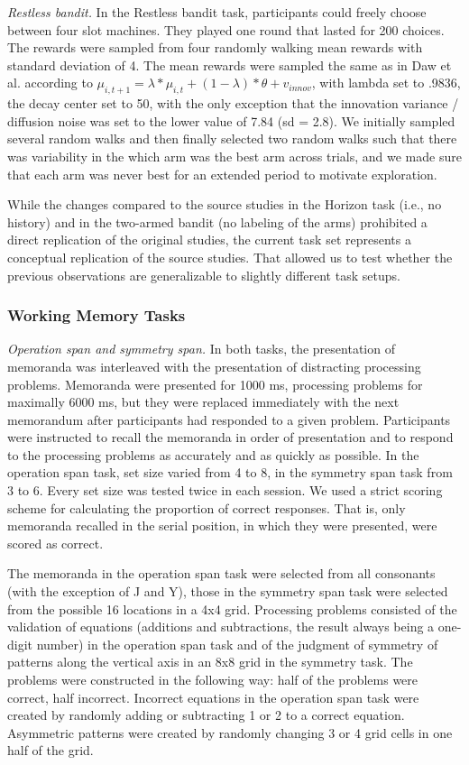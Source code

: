 \documentclass[fleqn,10pt]{wlscirep}
\begin{document}
\noindent \textit{Restless bandit.} In the Restless bandit task\cite{daw_cortical_2006}, participants could freely choose between four slot machines. They played one round that lasted for 200 choices. The rewards were sampled from four randomly walking mean rewards with standard deviation of 4. The mean rewards were sampled the same as in Daw et al.\cite{daw_cortical_2006} according to \(\mu_{i,t+1} = \lambda * \mu_{i,t} + (1 - \lambda)*\theta + v_{innov}\), with lambda set to .9836, the decay center set to 50, with the only exception that the innovation variance / diffusion noise was set to the lower value of 7.84 (sd = 2.8). We initially sampled several random walks and then finally selected two random walks such that there was variability in the which arm was the best arm across trials, and we made sure that each arm was never best for an extended period to motivate exploration.

While the changes compared to the source studies in the Horizon task (i.e., no history) and in the two-armed bandit (no labeling of the arms) prohibited a direct replication of the original studies, the current task set represents a conceptual replication \cite{crandall_scientific_2016} of the source studies. That allowed us to test whether the previous observations are generalizable to slightly different task setups.


\subsubsection*{Working Memory Tasks}

\noindent \textit{Operation span and symmetry span.} In both tasks, the presentation of memoranda was interleaved with the presentation of distracting processing problems. Memoranda were presented for 1000 ms, processing problems for maximally 6000 ms, but they were replaced immediately with the next memorandum after participants had responded to a given problem. Participants were instructed to recall the memoranda in order of presentation and to respond to the processing problems as accurately and as quickly as possible. In the operation span task, set size varied from 4 to 8, in the symmetry span task from 3 to 6. Every set size was tested twice in each session. We used a strict scoring scheme for calculating the proportion of correct responses. That is, only memoranda recalled in the serial position, in which they were presented, were scored as correct.

The memoranda in the operation span task were selected from all consonants (with the exception of J and Y), those in the symmetry span task were selected from the possible 16 locations in a 4x4 grid. Processing problems consisted of the validation of equations (additions and subtractions, the result always being a one-digit number) in the operation span task and of the judgment of symmetry of patterns along the vertical axis in an 8x8 grid in the symmetry task. The problems were constructed in the following way: half of the problems were correct, half incorrect. Incorrect equations in the operation span task were created by randomly adding or subtracting 1 or 2 to a correct equation. Asymmetric patterns were created by randomly changing 3 or 4 grid cells in one half of the grid.
\end{document}
